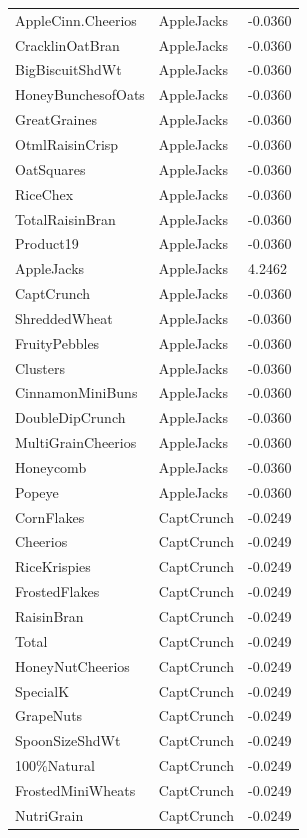 \begin{table}[!htbp]
\begin{tabular}{lll}
\\
AppleCinn.Cheerios & AppleJacks & -0.0360
\\
CracklinOatBran & AppleJacks & -0.0360
\\
BigBiscuitShdWt & AppleJacks & -0.0360
\\
HoneyBunchesofOats & AppleJacks & -0.0360
\\
GreatGraines & AppleJacks & -0.0360
\\
OtmlRaisinCrisp & AppleJacks & -0.0360
\\
OatSquares & AppleJacks & -0.0360
\\
RiceChex & AppleJacks & -0.0360
\\
TotalRaisinBran & AppleJacks & -0.0360
\\
Product19 & AppleJacks & -0.0360
\\
AppleJacks & AppleJacks & 4.2462
\\
CaptCrunch & AppleJacks & -0.0360
\\
ShreddedWheat & AppleJacks & -0.0360
\\
FruityPebbles & AppleJacks & -0.0360
\\
Clusters & AppleJacks & -0.0360
\\
CinnamonMiniBuns & AppleJacks & -0.0360
\\
DoubleDipCrunch & AppleJacks & -0.0360
\\
MultiGrainCheerios & AppleJacks & -0.0360
\\
Honeycomb & AppleJacks & -0.0360
\\
Popeye & AppleJacks & -0.0360
\\
CornFlakes & CaptCrunch & -0.0249
\\
Cheerios & CaptCrunch & -0.0249
\\
RiceKrispies & CaptCrunch & -0.0249
\\
FrostedFlakes & CaptCrunch & -0.0249
\\
RaisinBran & CaptCrunch & -0.0249
\\
Total & CaptCrunch & -0.0249
\\
HoneyNutCheerios & CaptCrunch & -0.0249
\\
SpecialK & CaptCrunch & -0.0249
\\
GrapeNuts & CaptCrunch & -0.0249
\\
SpoonSizeShdWt & CaptCrunch & -0.0249
\\
100\%Natural & CaptCrunch & -0.0249
\\
FrostedMiniWheats & CaptCrunch & -0.0249
\\
NutriGrain & CaptCrunch & -0.0249

\end{tabular}
\end{table}
